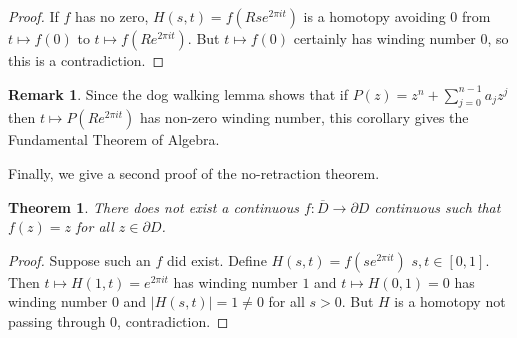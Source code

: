 \documentclass[a4paper, 10pt, twocolumn]{amsart}
\newtheorem*{theorem}{Theorem}
\theoremstyle{definition}
\newtheorem*{remark}{Remark}
\newcommand{\1}{\mathbbm{1}}
\begin{document}
\begin{proof}
    If $f$ has no zero, $H(s,t) = f(Rse^{2\pi it})$ is a homotopy avoiding $0$ from $t\mapsto f(0)$ to $t\mapsto f(Re^{2\pi it})$. But $t \mapsto f(0)$ certainly has winding number $0$, so this is a contradiction.
\end{proof}

\begin{remark}
    Since the dog walking lemma shows that if $P(z) = z^n+ \sum_{j=0}^{n-1} a_jz^j$ then $t \mapsto P(Re^{2\pi it})$ has non-zero winding number, this corollary gives the Fundamental Theorem of Algebra.
\end{remark}

Finally, we give a second proof of the no-retraction theorem.

\begin{theorem}
    There does not exist a continuous $f: \overline{D} \to \partial D$ continuous such that $f(z) = z$ for all $z \in \partial D$. 
\end{theorem}

\begin{proof}
    Suppose such an $f$ did exist. Define $H(s,t) = f(se^{2\pi it})$ $s,t \in [0,1]$. Then $t\mapsto H(1,t) = e^{2\pi it}$ has winding number $1$ and $t\mapsto H(0,1) = 0$ has winding number $0$ and $|H(s,t)| =1 \ne 0$ for all $s>0$. But $H$ is a homotopy not passing through $0$, contradiction. 
\end{proof}
\end{document}
